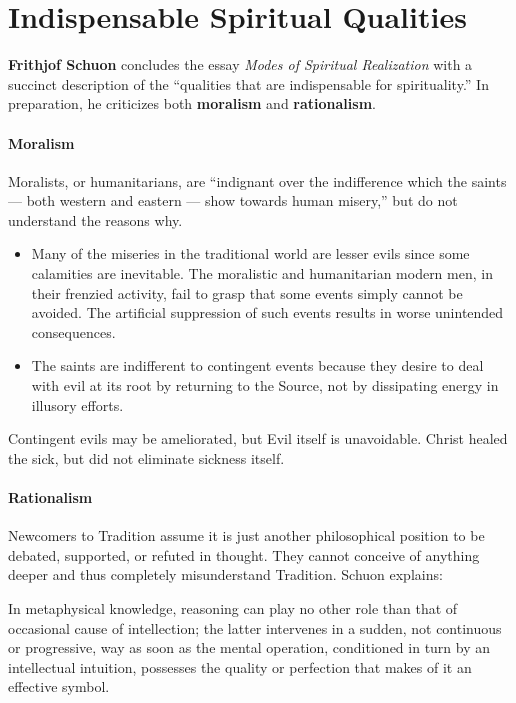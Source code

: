\section{Indispensable Spiritual Qualities}

\textbf{Frithjof Schuon} concludes the essay \emph{Modes of Spiritual Realization} with a succinct description of the ``qualities that are indispensable for spirituality.'' In preparation, he criticizes both \textbf{moralism} and \textbf{rationalism}.


\paragraph{Moralism}


Moralists, or humanitarians, are ``indignant over the indifference which the saints --- both western and eastern --- show towards human misery,'' but do not understand the reasons why.

\begin{itemize}


\item Many of the miseries in the traditional world are lesser evils since some calamities are inevitable. The moralistic and humanitarian modern men, in their frenzied activity, fail to grasp that some events simply cannot be avoided. The artificial suppression of such events results in worse unintended consequences.

\item The saints are indifferent to contingent events because they desire to deal with evil at its root by returning to the Source, not by dissipating energy in illusory efforts.
\end{itemize}


Contingent evils may be ameliorated, but Evil itself is unavoidable. Christ healed the sick, but did not eliminate sickness itself.

\paragraph{Rationalism}


Newcomers to Tradition assume it is just another philosophical position to be debated, supported, or refuted in thought. They cannot conceive of anything deeper and thus completely misunderstand Tradition. Schuon explains:

\begin{quotex}
In metaphysical knowledge, reasoning can play no other role than that of occasional cause of intellection; the latter intervenes in a sudden, not continuous or progressive, way as soon as the mental operation, conditioned in turn by an intellectual intuition, possesses the quality or perfection that makes of it an effective symbol.
\end{quotex}


